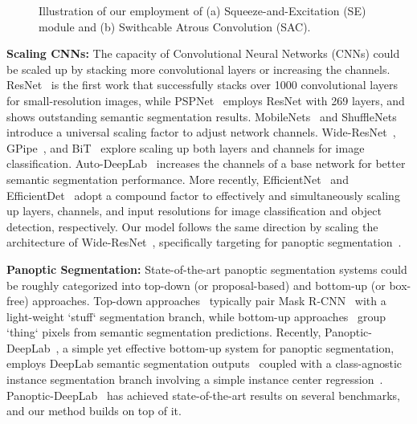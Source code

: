 \documentclass[final]{cvpr}
\begin{document}
\begin{figure*}[!t]
    \centering
    \caption{Illustration of our employment of (a) Squeeze-and-Excitation (SE) module and (b) Swithcable Atrous Convolution (SAC).}
    \label{fig:modules}
\end{figure*}

{\bf Scaling CNNs:} The capacity of Convolutional Neural Networks (CNNs) could be scaled up by stacking more convolutional layers or increasing the channels. ResNet~\cite{he2016deep} is the first work that successfully stacks over 1000 convolutional layers for small-resolution images, while PSPNet~\cite{zhao2017pyramid} employs ResNet with 269 layers, and shows outstanding semantic segmentation results. MobileNets~\cite{howard2017mobilenets,sandler2018mobilenetv2,howard2019searching} and ShuffleNets~\cite{ma2018shufflenet,ma2018shufflenet} introduce a universal scaling factor to adjust network channels. Wide-ResNet~\cite{wrn2016wide,wu2019wider}, GPipe~\cite{gpipe18}, and BiT~\cite{kolesnikov2020big} explore scaling up both layers and channels for image classification. Auto-DeepLab~\cite{liu2019auto} increases the channels of a base network for better semantic segmentation performance. More recently, EfficientNet~\cite{tan2019efficientnet} and EfficientDet~\cite{tan2020efficientdet} adopt a compound factor to effectively and simultaneously scaling up layers, channels, and input resolutions for image classification and object detection, respectively. Our model follows the same direction by scaling the architecture of Wide-ResNet~\cite{wrn2016wide,wu2019wider}, specifically targeting for panoptic segmentation~\cite{kirillov2018panoptic}.

{\bf Panoptic Segmentation:} State-of-the-art panoptic segmentation systems could be roughly categorized into top-down (or proposal-based) and bottom-up (or box-free) approaches. Top-down approaches~\cite{kirillov2019panoptic,porzi2019seamless,li2018learning,li2018attention,liu2019e2e,xiong2019upsnet,li2020unifying,Chen_2020_CVPR,Lazarow_2020_CVPR,wu2020bidirectional,wu2020auto} typically pair Mask R-CNN~\cite{he2017mask} with a light-weight `stuff` segmentation branch, while bottom-up approaches~\cite{yang2019deeperlab,gao2019ssap,Wang_2020_CVPR,cheng2019panoptic,wang2020axial} group `thing` pixels from semantic segmentation predictions. Recently, Panoptic-DeepLab~\cite{cheng2019panoptic}, a simple yet effective bottom-up system for panoptic segmentation, employs DeepLab semantic segmentation outputs~\cite{chen2018deeplabv2,deeplabv3plus2018} coupled with a class-agnostic instance segmentation branch involving a simple instance center regression~\cite{kendall2018multi,uhrig2018box2pix,neven2019instance}. Panoptic-DeepLab~\cite{cheng2019panopticworkshop} has achieved state-of-the-art results on several benchmarks, and our method builds on top of it.
\end{document}
